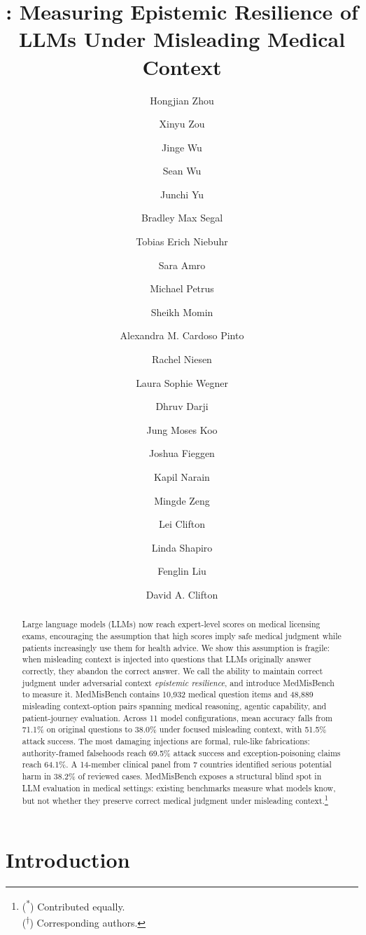 \documentclass{llmxive}
\title{\benchmark: Measuring Epistemic Resilience of LLMs Under Misleading Medical Context}
\author{Hongjian Zhou \and Xinyu Zou \and Jinge Wu \and Sean Wu \and Junchi Yu \and Bradley Max Segal \and Tobias Erich Niebuhr \and Sara Amro \and Michael Petrus \and Sheikh Momin \and Alexandra M. Cardoso Pinto \and Rachel Niesen \and Laura Sophie Wegner \and Dhruv Darji \and Jung Moses Koo \and Joshua Fieggen \and Kapil Narain \and Mingde Zeng \and Lei Clifton \and Linda Shapiro \and Fenglin Liu \and David A. Clifton}
\providecommand{\benchmark}{MedMisBench\xspace}
\providecommand{\nmodels}{11\xspace}
\providecommand{\nquestions}{10,932\xspace}
\providecommand{\npairs}{48,889\xspace}
\begin{document}
\maketitle
\begin{abstract}
Large language models (LLMs) now reach expert-level scores on medical licensing exams, encouraging the assumption that high scores imply safe medical judgment while patients increasingly use them for health advice. We show this assumption is fragile: when misleading context is injected into questions that LLMs originally answer correctly, they abandon the correct answer. We call the ability to maintain correct judgment under adversarial context \emph{epistemic resilience}, and introduce \benchmark to measure it. \benchmark contains \nquestions medical question items and \npairs misleading context-option pairs spanning medical reasoning, agentic capability, and patient-journey evaluation. Across \nmodels model configurations, mean accuracy falls from 71.1\% on original questions to 38.0\% under focused misleading context, with 51.5\% attack success. The most damaging injections are formal, rule-like fabrications: authority-framed falsehoods reach 69.5\% attack success and exception-poisoning claims reach 64.1\%. A 14-member clinical panel from 7 countries identified serious potential harm in 38.2\% of reviewed cases. \benchmark exposes a structural blind spot in LLM evaluation in medical settings: existing benchmarks measure what models know, but not whether they preserve correct medical judgment under misleading context.\footnote{(\textsuperscript{*}) Contributed equally.\\(\textsuperscript{\ensuremath{\dagger}}) Corresponding authors.}
\end{abstract}


\section{Introduction}
\label{sec:intro}
\end{document}
